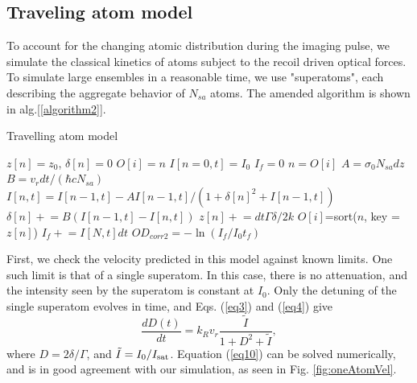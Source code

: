 \documentclass[12pt]{iopart}
\begin{document}
\subsection{Traveling atom model}
To account for the changing atomic distribution during the imaging pulse, we simulate the classical kinetics of atoms subject to the recoil driven optical forces. To simulate large ensembles in a reasonable time, we use "superatoms",  each describing the aggregate behavior of $N_{sa}$ atoms. The amended algorithm is shown in alg.[\ref{algorithm2}]. 
\begin{algorithm}
\caption{Travelling atom model}
\label{algorithm2}
\begin{algorithmic}
\STATE $z[n]=z_0$, $\delta[n]=0$ 
\STATE $O[i]=n$ 
\STATE $I[n=0,t]=I_0$  
\STATE $I_f=0$
\STATE $n=O[i]$ 
 \STATE $A=\sigma_0 N_{sa} dz$ 
 \STATE $B=v_r dt/(\hbar c  N_{sa})$  
\STATE $I[n,t]=I[n-1,t] - A I[n-1,t]/(1+\delta[n]^2+I[n-1,t])$  
\STATE $\delta[n]\mathrel{+}=B\left(I[n-1,t]-I[n,t]\right)$   
\STATE $z[n]\mathrel{+}=dt\Gamma\delta/2k$ 
\ENDFOR 
\STATE $O[i]$=sort($n$, key =$z[n]$) 
\STATE $I_f  \mathrel{+}= I[N,t]dt$
\ENDFOR
\STATE $OD_{corr2}=-\ln{(I_f/I_0t_f)}$
\end{algorithmic}
\end{algorithm}
\par First, we check the velocity predicted in this model against known limits. One such limit is that of a single superatom. In this case, there is no attenuation, and the intensity seen by the superatom is constant at $I_0$. Only the detuning of the single superatom evolves in time, and Eqs. (\ref{eq3}) and (\ref{eq4}) give
\begin{equation}
\frac{dD(t)}{dt}= k_R v_r \frac{\tilde{I}}{1+D^2+\tilde{I}},
\label{eq10}
\end{equation}
where $D = 2\delta/\Gamma$, and $\tilde{I} = I_0/I_{\rm{sat}}$. Equation (\ref{eq10}) can be solved numerically, and is in good agreement with our simulation, as seen in Fig. \ref{fig:oneAtomVel}.
\end{document}
